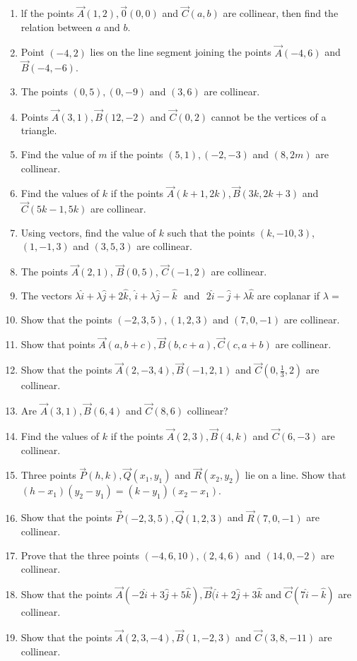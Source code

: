 \begin{enumerate}[label=\thesubsection.\arabic*, ref=\thesubsection.\theenumi]
\item lf the points $\vec{A}(1, 2), \vec{0}(0, 0)$ and $\vec{C}(a, b)$ are collinear, then find the relation between $a$ and $b$.
	\item Point $ (-4, 2)$ lies on the line segment joining the points $ \vec{A}(-4, 6)$  and  $\vec{B}(-4, -6)$.
 \item The points $(0, 5), (0, -9)$ and $(3, 6)$ are collinear.
\item Points $\vec{A}(3, 1),  \vec{B}(12, -2)$  and  $\vec {C}(0, 2)$ cannot be the vertices of a triangle.
\item Find the value of $m$ if the points $(5, 1), (-2, -3)$  and $(8, 2m)$ are collinear.
\item Find the values of $k$ if the points $\vec{A}(k+1, 2k), \vec{B}(3k, 2k+3)$ and $\vec{C}(5k-1, 5k)$ are collinear.
\item Using vectors,  find the value of $k$ such that the points $(k, -10, 3)$,  $(1, -1, 3)$  and  $(3, 5, 3)$ are collinear.
\item The points $\vec{A}(2, 1)$,  $\vec{B}(0, 5)$,  $\vec{C}(-1, 2)$ are collinear.
\item The vectors $\lambda\hat{i}+\lambda\hat{j}+2\hat{k}$,  $\hat{i}+\lambda\hat{j}-\hat{k}$ $\text{ and }$ $2\hat{i}-\hat{j}+\lambda\hat{k}$ are coplanar if
	$\lambda=$
\item Show that the points $(-2, 3, 5),  (1, 2, 3)$ and $(7, 0, -1)$ are collinear.
\item Show that points $\vec{A}(a,  b+c),  \vec{B}(b,  c+a),  \vec{C}(c,  a+b)$ are collinear.
\item Show that the points $\vec{A}(2, -3, 4),  \vec{B}(-1, 2, 1)$ and $\vec{C}(0, \frac{1}{3}, 2)$ are collinear.
\item Are $\vec{A}(3, 1), \vec{B}(6, 4)$ and $\vec{C}(8, 6)$ collinear?
\item Find the values of $k$ if the points $\vec{A}(2, 3),  \vec{B}(4, k)$ and $\vec{C}(6, -3)$ are collinear.
\item Three points $\vec{P}(h, k),  \vec{Q}(x_1, y_1)$ and $\vec{R}(x_2, y_2)$ lie on a line. Show that $(h-x_1)(y_2-y_1)=(k-y_1)(x_2-x_1)$.
\item Show that the points $\vec{P}(-2, 3, 5),  \vec{Q}(1, 2, 3)$ and $\vec{R}(7, 0, -1)$ are collinear. 
\item Prove that the three points $(-4, 6, 10),  (2, 4, 6)$ and $(14, 0, -2)$ are collinear.
\item Show that the points $\vec{A}(-2\hat{i} +3\hat{j} +5\hat{k}),  \vec{B}(\hat{i}+2\hat{j} +3\hat{k}$ and $\vec{C}(7\hat{i} -\hat{k})$ are collinear.
\item Show that the points $\vec{A}(2,  3,  -4),  \vec{B}(1,  -2,  3)$ and $\vec{C}(3,  8,  -11)$ are collinear.
\end{enumerate}
